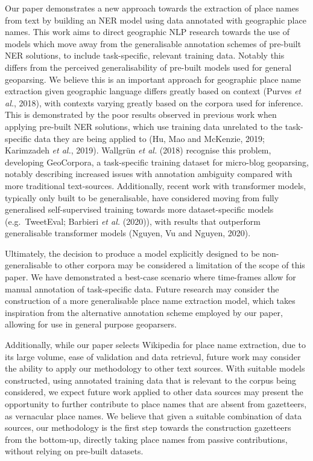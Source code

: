 \documentclass[
  letterpaper,
  11pt,
  english,
  onehalfspacing,
  headsepline]{MastersDoctoralThesis}
\begin{document}
Our paper demonstrates a new approach towards the extraction of place
names from text by building an NER model using data annotated with
geographic place names. This work aims to direct geographic NLP research
towards the use of models which move away from the generalisable
annotation schemes of pre-built NER solutions, to include task-specific,
relevant training data. Notably this differs from the perceived
generalisability of pre-built models used for general geoparsing. We
believe this is an important approach for geographic place name
extraction given geographic language differs greatly based on context
(Purves \emph{et al.}, 2018), with contexts varying greatly based on the
corpora used for inference. This is demonstrated by the poor results
observed in previous work when applying pre-built NER solutions, which
use training data unrelated to the task-specific data they are being
applied to (Hu, Mao and McKenzie, 2019; Karimzadeh \emph{et al.}, 2019).
Wallgrün \emph{et al.} (2018) recognise this problem, developing
GeoCorpora, a task-specific training dataset for micro-blog geoparsing,
notably describing increased issues with annotation ambiguity compared
with more traditional text-sources. Additionally, recent work with
transformer models, typically only built to be generalisable, have
considered moving from fully generalised self-supervised training
towards more dataset-specific models (e.g.~TweetEval; Barbieri \emph{et
al.} (2020)), with results that outperform generalisable transformer
models (Nguyen, Vu and Nguyen, 2020).

Ultimately, the decision to produce a model explicitly designed to be
non-generalisable to other corpora may be considered a limitation of the
scope of this paper. We have demonstrated a best-case scenario where
time-frames allow for manual annotation of task-specific data. Future
research may consider the construction of a more generalisable place
name extraction model, which takes inspiration from the alternative
annotation scheme employed by our paper, allowing for use in general
purpose geoparsers.

Additionally, while our paper selects Wikipedia for place name
extraction, due to its large volume, ease of validation and data
retrieval, future work may consider the ability to apply our methodology
to other text sources. With suitable models constructed, using annotated
training data that is relevant to the corpus being considered, we expect
future work applied to other data sources may present the opportunity to
further contribute to place names that are absent from gazetteers, as
vernacular place names. We believe that given a suitable combination of
data sources, our methodology is the first step towards the construction
gazetteers from the bottom-up, directly taking place names from passive
contributions, without relying on pre-built datasets.
\end{document}
